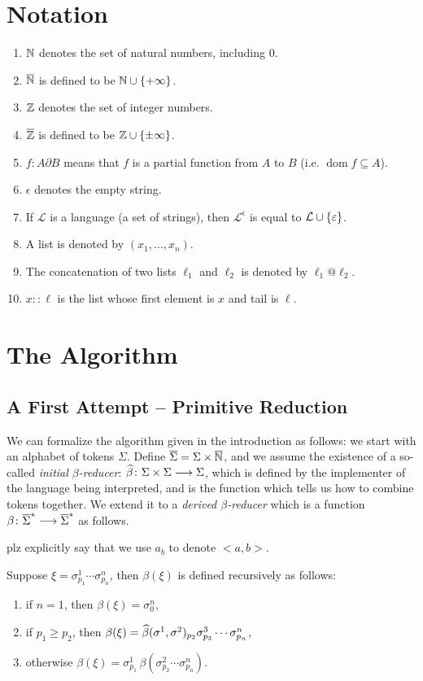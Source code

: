 \documentclass{llncs}
\newcounter{algo}
\newcommand{\yoni}[1]{{\begin{mdframed}[linecolor=red]{\color{red}#1}\end{mdframed}}}
\begin{document}
\section{Notation}

\begin{enumerate}
    \item $\mathbb N$ denotes the set of natural numbers, including $0$.
    \item $\overline{\mathbb N}$ is defined to be $\bN\cup\set{+\infty}$.
    \item $\mathbb Z$ denotes the set of integer numbers.
    \item $\overline{\mathbb Z}$ is defined to be $\bZ\cup\set{\pm\infty}$.
    \item $f\colon A\partial B$ means that $f$ is a partial function from $A$ to $B$ (i.e. $\operatorname{dom}f\subseteq A$).
    \item $\epsilon$ denotes the empty string.
    \item If $\mathcal L$ is a language (a set of strings), then $\mathcal L^\epsilon$ is equal to $\mathcal L\cup\set\epsilon$.
    \item A list is denoted by $(x_1,\dots,x_n)$.
    \item The concatenation of two lists $\ell_1$ and $\ell_2$ is denoted by $\ell_1@\ell_2$.
    \item $x::\ell$ is the list whose first element is $x$ and tail is $\ell$.
\end{enumerate}

\section{The Algorithm}

\subsection{A First Attempt -- Primitive Reduction} \label{sec:firstattempt}

We can formalize the algorithm given in the introduction as follows: we start with an alphabet of tokens $\Sigma$.
Define $\overline\Sigma=\Sigma\times\overline{\mathbb N}$, and we assume the existence of a so-called \textit{initial $\beta$-reducer}:
$\widehat\beta\colon \Sigma\times\Sigma \longrightarrow \Sigma$, which is defined by the implementer of the language being interpreted, and is the function which
tells us how to combine tokens together.
We extend it to a \textit{derived $\beta$-reducer} which is a function $\beta\colon\overline\Sigma^*\longrightarrow\overline\Sigma^*$ as follows.
\yoni{plz explicitly say that we use $a_b$ to denote $<a,b>$.}
Suppose $\xi=\sigma^1_{p_1}\cdots\sigma^n_{p_n}$, then $\beta(\xi)$ is defined recursively as follows:
\begin{enumerate}
    \item if $n=1$, then $\beta(\xi)=\sigma^n_0$,
    \item if $p_1\geq p_2$, then $\beta(\xi)=\widehat\beta(\sigma^1,\sigma^2)_{p_2}\sigma^3_{p_3}\cdots\sigma^n_{p_n}$,
    \item otherwise $\beta(\xi)=\sigma^1_{p_1}\,\beta(\sigma^2_{p_2}\cdots\sigma^n_{p_n})$.
\end{enumerate}
\end{document}
